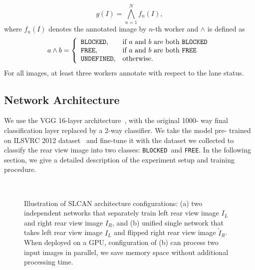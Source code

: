 \documentclass[letterpaper, 10pt, conference]{ieeeconf}
\newcommand{\B}{{\tt BLOCKED}}
\newcommand{\F}{{\tt FREE}}
\begin{document}
	\begin{equation}
		g(I) = \bigwedge_{n=1}^N{f}_n(I), 
	\end{equation}
where $f_n(I)$ denotes the annotated image by $n$-th worker and $\wedge$ is defined as
	\[
		a \wedge b = \left\{
			\begin{array}{ll}
				\texttt{BLOCKED},& \mbox{if $a$ and $b$ are both \texttt{BLOCKED}}\\
				\texttt{FREE},& \mbox{if $a$ and $b$ are both \texttt{FREE}}\\
				\texttt{UNDEFINED},& \mbox{otherwise.}\\				
			\end{array}
			\right.
	\]
For all images, at least three workers annotate with respect to the lane status.
	\subsection{Network Architecture}%
    We use the VGG 16-layer architecture~\cite{Simonyan2014}, with the original 1000-%
way final classification layer replaced by a 2-way classifier. We take the model pre-%
trained on ILSVRC 2012 dataset~\cite{Deng2009} and fine-tune it with the dataset we
collected to classify the rear view image into two classes: \B~and
\F. In the following section, we give a detailed description of the experiment setup
and training procedure.
	
	\begin{figure}[t]
		\centering      
		~
		\caption{Illustration of SLCAN architecture configurations: (a) two independent
networks that separately train left rear view image $I_L$ and right rear view image $I_R$, 
and (b) unified single network that takes left rear view image $I_L$ and flipped right 
rear view image $\tilde{I}_R$. When deployed on a GPU, configuration of (b) can process
two input images in parallel, we save memory space without additional processing time.
}\label{fig:networks}\vspace{-0.3cm}
	\end{figure}
\end{document}
